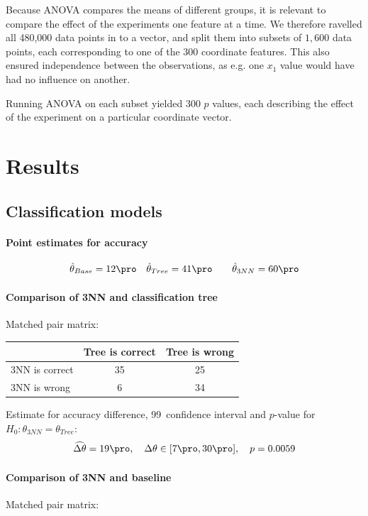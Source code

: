 \documentclass[11pt,fleqn]{article}
\begin{document}
Because ANOVA compares the means of different groups, it is relevant to compare the effect of the experiments one feature at a time.
We therefore ravelled all 480,000 data points in to a vector, and split them into subsets of $ 1,600 $ data points, each corresponding to one of the $ 300 $ coordinate features.
This also ensured independence between the observations, as e.g. one $ x_1 $ value would have had no influence on another.

Running ANOVA on each subset yielded 300 $ p $ values, each describing the effect of the experiment on a particular coordinate vector. 


\section{Results}

\subsection{Classification models}

\paragraph{Point estimates for accuracy}

\begin{align*}
	& \hat \theta_{Base}= 12\pro 
	&& \hat \theta_{Tree} =41\pro 
	&&&\hat \theta_{3NN} = 60 \pro 
\end{align*}
\paragraph{Comparison of 3NN and classification tree}
Matched pair matrix:

\begin{table}[H]
	\centering
	\begin{tabular}{l|c c}
		&Tree is correct& Tree is wrong \\
		\hline
		3NN is correct &35& 25\\
		3NN is wrong& 6& 34
	\end{tabular}
\end{table}\noindent 
Estimate for accuracy difference, 99\pro\ confidence interval and \(p\)-value for \(H_0: \theta_{3NN}=\theta_{Tree}\):
\[
\widehat{\Delta \theta} = 19\pro,\quad  \Delta \theta\in[7\pro , 30\pro], \quad p = 0.0059 
\]

\paragraph{Comparison of 3NN and baseline}
Matched pair matrix:
\end{document}
